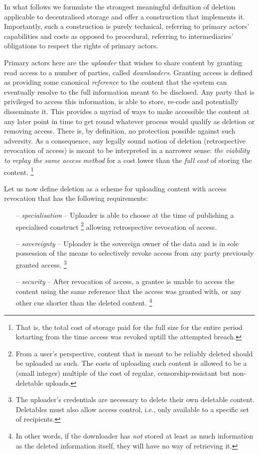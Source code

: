 In what follows we formulate the strongest meaningful definition of deletion applicable to decentralised storage and offer a construction that implements it.
Importantly, such a construction is purely technical, referring to primary actors' capabilities and costs as opposed to procedural, referring to intermediaries' obligations to respect the rights of primary actors. 

Primary actors here are the \emph{uploader} that wishes to share content by granting read access to a number of parties, called \emph{downloaders}.  Granting access is defined as providing some canonical \emph{reference} to the content that the system can eventually resolve to the full information meant to be disclosed. Any party that is privileged to access this information, is able to store, re-code and potentially disseminate it. This provides a myriad of ways to make accessible the content at any later point in time to get round whatever process would qualify as deletion or removing access. 
There is, by definition, no protection possible against such adversity. As a consequence, any legally sound notion of deletion (retrospective revocation of access) is meant to be interpreted in a narrower sense: \emph{the viability to replay the same access method}  for a cost lower than the \emph{full cost} of storing the content.%
%
\footnote{That is, the total cost of storage paid for the full size for the entire period kstarting from the time access was revoked uptill the attempted breach.}

Let us now define deletion as a scheme for uploading content with access revocation that has the following requirements: 

\begin{itemize}[noitemsep]
    \item[--] \emph{specialisation} -- Uploader is able to choose at the time of publishing a specialised construct%
%
\footnote{From a user's perspective, content that is meant to be reliably deleted should be uploaded as such. The costs of uploading such content is allowed to be a (small integer) multiple of the cost of regular, censorship-resistant but non-deletable uploads.}
%
    allowing retrospective revocation of access.
    \item[--] \emph{sovereignty} -- Uploader is the sovereign owner of the data and is in sole possession of the means to selectively revoke access from any party previously granted access.%
%
\footnote{The uploader's credentials are necessary to delete their own deletable content. Deletables must also allow access control, i.e., only available to a specific set of recipients.}
%
    \item[--] \emph{security} -- After revocation of access, a grantee is unable to access the content using the same reference that the access was granted with, or any other cue shorter than the deleted content.%
%
\footnote{In other words, if the downloader has \emph{not} stored at least as much information as the deleted information itself, they will have no way of retrieving it.}
%
\end{itemize}

